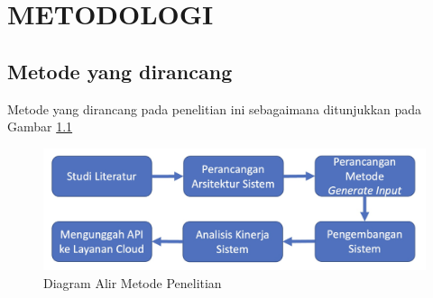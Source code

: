 \chapter{METODOLOGI}
\label{chap:metodologi}

\section{Metode yang dirancang}
\label{sec:metode yang dirancang}

Metode yang dirancang pada penelitian ini sebagaimana ditunjukkan pada Gambar \ref{fig:metode}

\begin{figure}[H]
  \centering
  \includegraphics[scale=0.25]{gambar/DiagramAlirMetodePenelitian.jpg}

  \caption{Diagram Alir Metode Penelitian}
  \label{fig:metode}
\end{figure}

